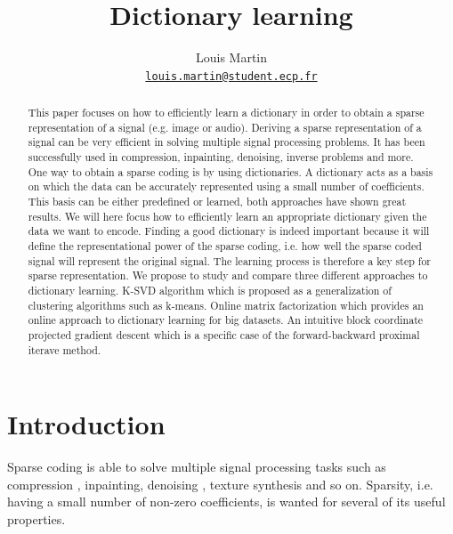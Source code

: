 \documentclass[a4paper,11pt]{article}
\title{Dictionary learning}
\author{
  Louis Martin\\
  \href{mailto:louis.martin@student.ecp.fr}{\tt louis.martin@student.ecp.fr}
}
\begin{document}
\maketitle

\begin{abstract}
This paper focuses on how to efficiently learn a dictionary in order to obtain a sparse representation of a signal (e.g. image or audio).
Deriving a sparse representation of a signal can be very efficient in solving multiple signal processing problems.
It has been successfully used in compression, inpainting, denoising, inverse problems and more.
One way to obtain a sparse coding is by using dictionaries.
A dictionary acts as a basis on which the data can be accurately represented using a small number of coefficients.
This basis can be either predefined or learned, both approaches have shown great results.
We will here focus how to efficiently learn an appropriate dictionary given the data we want to encode.
Finding a good dictionary is indeed important because it will define the representational power of the sparse coding,
i.e. how well the sparse coded signal will represent the original signal.
The learning process is therefore a key step for sparse representation.
We propose to study and compare three different approaches to dictionary learning.
K-SVD algorithm which is proposed as a generalization of clustering algorithms such as k-means.
Online matrix factorization which provides an online approach to dictionary learning for big datasets.
An intuitive block coordinate projected gradient descent which is a specific case of the forward-backward proximal iterave method.

\end{abstract}

\section{Introduction}
Sparse coding is able to solve multiple signal processing tasks such as compression \cite{marcellin00}, inpainting, denoising \cite{elad06}, texture synthesis \cite{peyre09} and so on.
Sparsity, i.e. having a small number of non-zero coefficients, is wanted for several of its useful properties.
\end{document}
